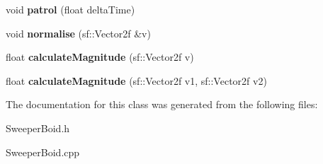 \begin{DoxyCompactItemize}
void {\bfseries patrol} (float delta\+Time)
\item 
\mbox{\label{class_sweeper_boid_a065ded798eb1b37ab4cc9944824795c9}} 
void {\bfseries normalise} (sf\+::\+Vector2f \&v)
\item 
\mbox{\label{class_sweeper_boid_a91e883fffbab6b77c509cd4a482a8137}} 
float {\bfseries calculate\+Magnitude} (sf\+::\+Vector2f v)
\item 
\mbox{\label{class_sweeper_boid_a148901a7afea04b6bab331053e15655a}} 
float {\bfseries calculate\+Magnitude} (sf\+::\+Vector2f v1, sf\+::\+Vector2f v2)
\end{DoxyCompactItemize}


The documentation for this class was generated from the following files\+:\begin{DoxyCompactItemize}
\item 
Sweeper\+Boid.\+h\item 
Sweeper\+Boid.\+cpp\end{DoxyCompactItemize}
